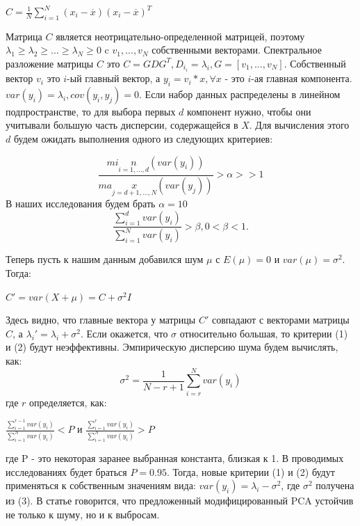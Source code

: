 \documentclass[english, russian]{sobraep}
\begin{document}
\begin{center}
    $C = \frac{1}{N}\sum_{i=1}^N(x_i - \overline{x})(x_i - \overline{x})^T$
\end{center}

Матрица $C$ является неотрицательно-определенной матрицей, поэтому $\lambda_1 \geq \lambda_2 \geq ... \geq \lambda_N \geq 0$ c $v_1, ..., v_N$ собственными векторами. Спектральное разложение матрицы $C$ это $C = GDG^T, D_i_i = \lambda_i, G = [v_1, ..., v_N]$. Собственный вектор $v_i$ это $i$-ый главный вектор, а $y_i = v_i * x, \forall x$ - это $i$-ая главная компонента. $var(y_i) = \lambda_i, cov(y_i, y_j) = 0$.
Если набор данных распределены в линейном подпространстве, то для выбора первых $d$ компонент нужно, чтобы они учитывали большую часть дисперсии, содержащейся в $X$. Для вычисления этого $d$ будем ожидать выполнения одного из следующих критериев:

\begin{equation}
   \frac{min\limits_{i=1, ...,d}(var(y_i))}
        {max\limits_{j=d+1, ...,N}(var(y_j))} > \alpha >> 1
\end{equation}
В наших исследования будем брать $\alpha = 10$
\begin{equation}
   \frac{\sum_{i=1}^d var(y_i)}
        {\sum_{i=1}^N var(y_i)} > \beta,    0 < \beta < 1.
\end{equation}

Теперь пусть к нашим данным добавился шум $\mu$ с $E(\mu) = 0$ и $var(\mu) = \sigma^2$. Тогда:
\begin{center}
    $C' = var(X + \mu) = C + \sigma^2I$
\end{center}

Здесь видно, что главные вектора у матрицы $C'$ совпадают с векторами матрицы $C$, а $\lambda_i' = \lambda_i + \sigma^2$. Если окажется, что $\sigma$ относительно большая, то критерии (1) и (2) будут неэффективны.
Эмпирическую дисперсию шума будем вычислять, как:
\begin{equation}
    \sigma^2 = \frac{1}{N - r + 1}\sum_{i=r}^N var(y_i)
\end{equation}
где $r$ определяется, как:

\begin{center}
    $\frac{\sum_{i=1}^{r-1} var(y_i)}{\sum_{i=1}^{N} var(y_i)} < P$
    и
    $\frac{\sum_{i=1}^{r} var(y_i)}{\sum_{i=1}^{N} var(y_i)} > P$
\end{center}
где P - это некоторая заранее выбранная константа, близкая к 1. В проводимых исследованиях будет браться $P = 0.95$.
Тогда, новые критерии (1) и (2) будут применяться к собственным значениям вида: $var(y_i) = \lambda_i - \sigma^2$, где $\sigma^2$ получена из (3).
В статье говорится, что предложенный модифицированный PCA устойчив не только к шуму, но и к выбросам.
\end{document}
